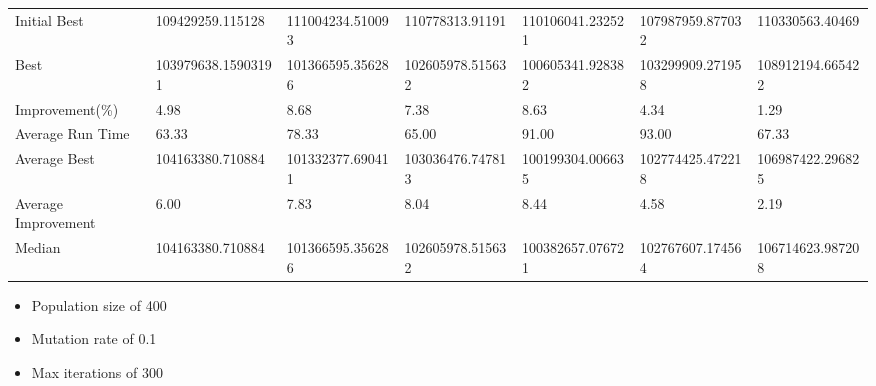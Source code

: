 \begin{table}[H]
{\begin{tabular}{lllllll}
\cellcolor[HTML]{ECF4FF}Initial Best        & 109429259.115128   & 111004234.510093 & 110778313.91191  & 110106041.232521 & 107987959.877032 & 110330563.40469  \\
\cellcolor[HTML]{ECF4FF}Best                & 103979638.15903191 & 101366595.356286 & 102605978.515632 & 100605341.928382 & 103299909.271958 & 108912194.665422 \\
\cellcolor[HTML]{ECF4FF}Improvement(\%)     & 4.98               & 8.68             & 7.38             & 8.63             & 4.34             & 1.29             \\
\rowcolor[HTML]{CBCEFB} 
\cellcolor[HTML]{DAE8FC}Average Run Time    & 63.33              & 78.33            & 65.00            & 91.00            & 93.00            & 67.33            \\
\rowcolor[HTML]{CBCEFB} 
\cellcolor[HTML]{DAE8FC}Average Best        & 104163380.710884   & 101332377.690411 & 103036476.747813 & 100199304.006635 & 102774425.472218 & 106987422.296825 \\
\rowcolor[HTML]{CBCEFB} 
\cellcolor[HTML]{DAE8FC}Average Improvement & 6.00               & 7.83             & 8.04             & 8.44             & 4.58             & 2.19             \\
\rowcolor[HTML]{CBCEFB} 
\cellcolor[HTML]{DAE8FC}Median              & 104163380.710884   & 101366595.356286 & 102605978.515632 & 100382657.076721 & 102767607.174564 & 106714623.987208
\end{tabular}%
}
\end{table}

\begin{itemize}
  \item Population size of 400
  \item Mutation rate of 0.1
  \item Max iterations of 300
\end{itemize}

